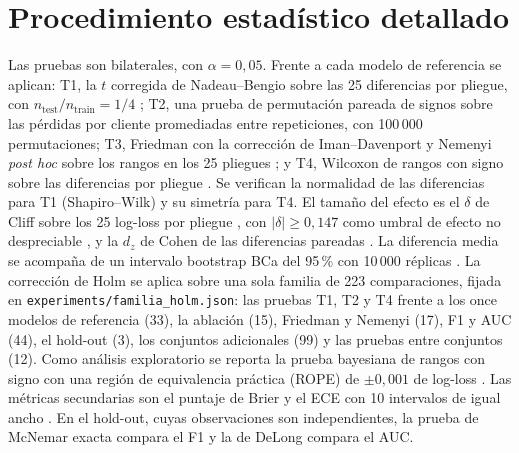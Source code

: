 \documentclass[11pt,a4paper]{article}
\begin{document}
\section{Procedimiento estadístico detallado}\label{app:estadistica}
Las pruebas son bilaterales, con $\alpha=0{,}05$. Frente a cada modelo de referencia se aplican: T1, la $t$ corregida de Nadeau--Bengio sobre las 25 diferencias por pliegue, con $n_{\text{test}}/n_{\text{train}}=1/4$ \cite{nadeau2003}; T2, una prueba de permutación pareada de signos sobre las pérdidas por cliente promediadas entre repeticiones, con 100\,000 permutaciones; T3, Friedman con la corrección de Iman--Davenport y Nemenyi \emph{post hoc} sobre los rangos en los 25 pliegues \cite{demsar2006}; y T4, Wilcoxon de rangos con signo sobre las diferencias por pliegue \cite{wilcoxon1945}. Se verifican la normalidad de las diferencias para T1 (Shapiro--Wilk) y su simetría para T4. El tamaño del efecto es el $\delta$ de Cliff sobre los 25 log-loss por pliegue \cite{cliff1993}, con $|\delta|\ge0{,}147$ como umbral de efecto no despreciable \cite{romano2006}, y la $d_z$ de Cohen de las diferencias pareadas \cite{lakens2013}. La diferencia media se acompaña de un intervalo bootstrap BCa del 95\,\% con 10\,000 réplicas \cite{efron1987}. La corrección de Holm \cite{holm1979} se aplica sobre una sola familia de 223 comparaciones, fijada en \texttt{experiments/familia\_holm.json}: las pruebas T1, T2 y T4 frente a los once modelos de referencia (33), la ablación (15), Friedman y Nemenyi (17), F1 y AUC (44), el hold-out (3), los conjuntos adicionales (99) y las pruebas entre conjuntos (12). Como análisis exploratorio se reporta la prueba bayesiana de rangos con signo con una región de equivalencia práctica (ROPE) de $\pm0{,}001$ de log-loss \cite{benavoli2017}. Las métricas secundarias son el puntaje de Brier \cite{brier1950} y el ECE con 10 intervalos de igual ancho \cite{naeini2015}. En el hold-out, cuyas observaciones son independientes, la prueba de McNemar exacta \cite{mcnemar1947} compara el F1 y la de DeLong \cite{delong1988} compara el AUC.
\end{document}
